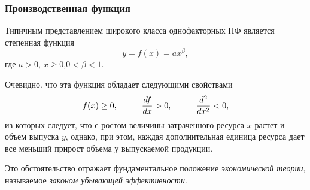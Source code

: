 \documentclass[10pt, pdf, hyperref={unicode}]{beamer}
\begin{document}
    \begin{frame}
        \frametitle{Производственная функция}
        \begin{center}
            \begin{minipage}[h]{0.97\linewidth}
                Типичным представлением широкого класса однофакторных ПФ является
                степенная функция
                \begin{equation}\label{f12}
                y=f(x)=ax^\beta,
                \end{equation}
                где $a>0$, $x\ge0$,$0<\beta<1$.

                Очевидно. что эта функция обладает следующими свойствами
                $$f(x)\ge0,\hspace{10mm}\frac{df}{dx}>0,\hspace{10mm}\frac{d^2}{dx^2}<0,$$
                из которых следует, что с ростом величины затраченного ресурса $x$
                растет и объем выпуска $y$, однако, при этом, каждая дополнительная
                единица ресурса дает все меньший прирост объема у выпускаемой
                продукции.

                Это обстоятельство отражает фундаментальное положение {\it
                экономической теории}, называемое {\it законом убывающей
                эффективности}.
            \end{minipage}
        \end{center}
    \end{frame}
\end{document}
